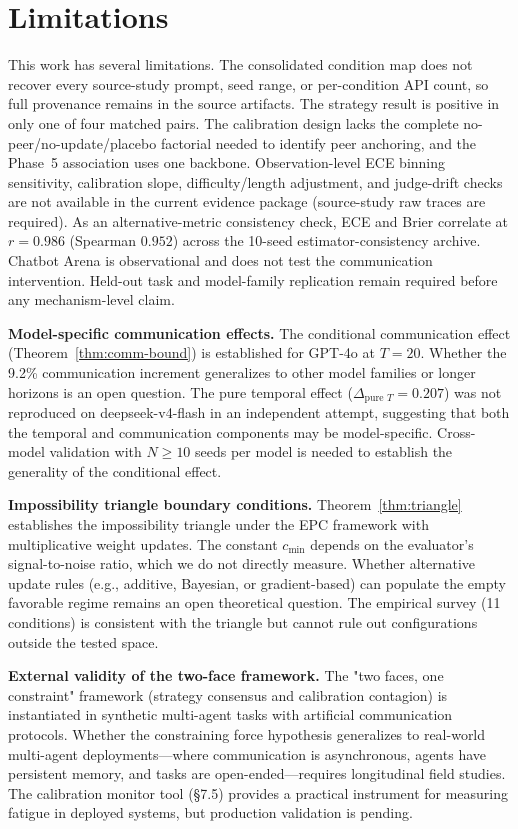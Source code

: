 \documentclass[11pt]{article}
\begin{document}
\section{Limitations}
This work has several limitations. The consolidated condition map does not recover every source-study prompt, seed range, or per-condition API count, so full provenance remains in the source artifacts. The strategy result is positive in only one of four matched pairs. The calibration design lacks the complete no-peer/no-update/placebo factorial needed to identify peer anchoring, and the Phase~5 association uses one backbone. Observation-level ECE binning sensitivity, calibration slope, difficulty/length adjustment, and judge-drift checks are not available in the current evidence package (source-study raw traces are required). As an alternative-metric consistency check, ECE and Brier correlate at $r = 0.986$ (Spearman $0.952$) across the 10-seed estimator-consistency archive. Chatbot Arena is observational and does not test the communication intervention. Held-out task and model-family replication remain required before any mechanism-level claim.



\textbf{Model-specific communication effects.} The conditional communication effect (Theorem~\ref{thm:comm-bound}) is established for GPT-4o at $T{=}20$. Whether the 9.2\% communication increment generalizes to other model families or longer horizons is an open question. The pure temporal effect ($\Delta_{\text{pure } T}{=}0.207$) was not reproduced on deepseek-v4-flash in an independent attempt, suggesting that both the temporal and communication components may be model-specific. Cross-model validation with $N{\geq}10$ seeds per model is needed to establish the generality of the conditional effect.

\textbf{Impossibility triangle boundary conditions.} Theorem~\ref{thm:triangle} establishes the impossibility triangle under the EPC framework with multiplicative weight updates. The constant $c_{\min}$ depends on the evaluator's signal-to-noise ratio, which we do not directly measure. Whether alternative update rules (e.g., additive, Bayesian, or gradient-based) can populate the empty favorable regime remains an open theoretical question. The empirical survey (11 conditions) is consistent with the triangle but cannot rule out configurations outside the tested space.

\textbf{External validity of the two-face framework.} The "two faces, one constraint" framework (strategy consensus and calibration contagion) is instantiated in synthetic multi-agent tasks with artificial communication protocols. Whether the constraining force hypothesis generalizes to real-world multi-agent deployments—where communication is asynchronous, agents have persistent memory, and tasks are open-ended—requires longitudinal field studies. The calibration monitor tool (\S7.5) provides a practical instrument for measuring fatigue in deployed systems, but production validation is pending.
\end{document}
